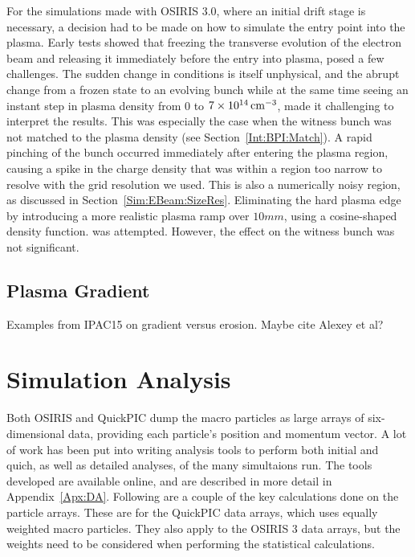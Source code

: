 For the simulations made with OSIRIS 3.0, where an initial drift stage is necessary, a decision had to be made on how to simulate the entry point into the plasma.
Early tests showed that freezing the transverse evolution of the electron beam and releasing it immediately before the entry into plasma, posed a few challenges.
The sudden change in conditions is itself unphysical, and the abrupt change from a frozen state to an evolving bunch while at the same time seeing an instant step in plasma density from $0$ to $7\times 10^{14}\,\mathrm{cm}^{-3}$, made it challenging to interpret the results.
This was especially the case when the witness bunch was not matched to the plasma density (see Section~\ref{Int:BPI:Match}).
A rapid pinching of the bunch occurred immediately after entering the plasma region, causing a spike in the charge density that was within a region too narrow to resolve with the grid resolution we used.
This is also a numerically noisy region, as discussed in Section~\ref{Sim:EBeam:SizeRes}.
Eliminating the hard plasma edge by introducing a more realistic plasma ramp over $10\unit{mm}$, using a cosine-shaped density function. was attempted.
However, the effect on the witness bunch was not significant.

\subsection{Plasma Gradient}
\label{Sim:Plasma:Grad}

Examples from IPAC15 on gradient versus erosion. Maybe cite Alexey et al?

\section{Simulation Analysis}
\label{Apx:SA}

Both OSIRIS and QuickPIC dump the macro particles as large arrays of six-dimensional data, providing each particle's position and momentum vector.
A lot of work has been put into writing analysis tools to perform both initial and quich, as well as detailed analyses, of the many simultaions run.
The tools developed are available online, and are described in more detail in Appendix~\ref{Apx:DA}.
Following are a couple of the key calculations done on the particle arrays.
These are for the QuickPIC data arrays, which uses equally weighted macro particles.
They also apply to the OSIRIS 3 data arrays, but the weights need to be considered when performing the statistical calculations.

